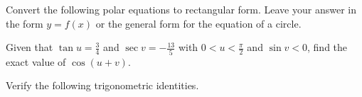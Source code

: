 \documentclass[addpoints]{exam}
\begin{document}
\begin{questions}

    \newpage

    \question Convert the following polar equations to rectangular form. Leave your answer in the form $y=f(x)$ or the general form for the equation of a circle.


    \newpage

    

    \question[3] Given that $\tan u=\frac{3}{4}$ and $\sec v=-\frac{13}{5}$ with $0<u<\frac{\pi}{2}$ and $\sin v<0$, find the exact value of $\cos(u+v)$.


    \question Verify the following trigonometric identities.
\end{questions}
\end{document}
